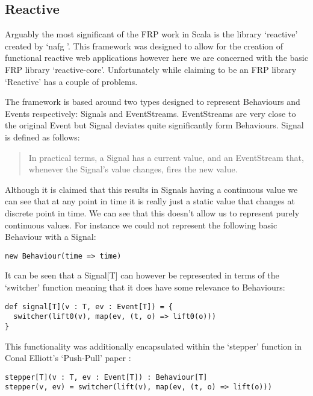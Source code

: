     \subsection{Reactive}
      Arguably the most significant of the FRP work in Scala is the library `reactive' created by `nafg \cite{Nafg}'. This    
      framework was designed to allow for the creation of functional reactive web applications however here we are concerned 
      with the basic FRP library `reactive-core'. Unfortunately while claiming to be an FRP library `Reactive'
      has a couple of problems.
      
      The framework is based around two types designed to represent Behaviours and Events respectively: Signals
      and EventStreams. EventStreams are very close to the original Event but Signal deviates quite significantly form 
      Behaviours. Signal is defined as follows:
      
      \begin{quote}
        In practical terms, a Signal has a current value, and an EventStream that, whenever the Signal's value changes,     
        fires the new value.
      \end{quote}  
      
      Although it is claimed that this results in Signals having a continuous value we can see
      that at any point in time it is really just a static value that changes at discrete point in
      time. We can see that this doesn't allow us to represent purely continuous values. For instance
      we could not represent the following basic Behaviour with a Signal:
      
\begin{verbatim}
new Behaviour(time => time)
\end{verbatim}

      It can be seen that a Signal[T] can however be represented in terms
      of the `switcher' function meaning that it does have some relevance to Behaviours:
      
\begin{verbatim}
def signal[T](v : T, ev : Event[T]) = {
  switcher(lift0(v), map(ev, (t, o) => lift0(o)))
}
\end{verbatim}  

      This functionality was additionally encapsulated within the `stepper' function in Conal Elliott's
      `Push-Pull' paper \cite{Elliott2009}:

\begin{verbatim}
stepper[T](v : T, ev : Event[T]) : Behaviour[T]
stepper(v, ev) = switcher(lift(v), map(ev, (t, o) => lift(o)))
\end{verbatim} 

